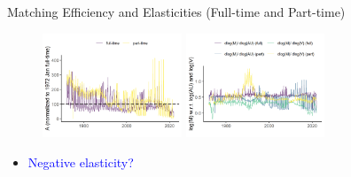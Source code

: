 \documentclass[aspectratio=169]{beamer}
\begin{document}
\begin{frame}{Matching Efficiency and Elasticities (Full-time and Part-time)}
    \begin{figure}[!ht]
  \begin{center}
  \includegraphics[width = 0.37\textwidth]
  {figuretable/matching_efficiency_month_full_time_part_time.png}
  \includegraphics[width = 0.37\textwidth]
  {figuretable/elasticity_month_full_time_part_time.png}
  \end{center}
  \footnotesize
\end{figure} 

\begin{itemize}
    \item \textcolor{blue}{Negative elasticity?}
\end{itemize}
\end{frame}
\end{document}
